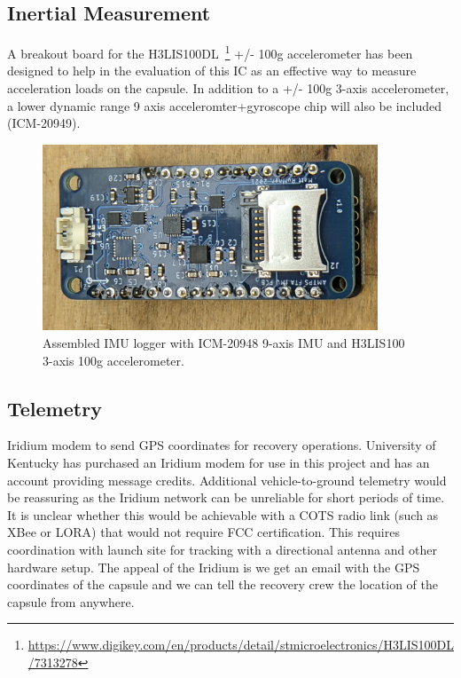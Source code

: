 \documentclass{article}
\begin{document}
\subsection{Inertial Measurement}
A breakout board for the H3LIS100DL~\footnote{\url{https://www.digikey.com/en/products/detail/stmicroelectronics/H3LIS100DL/7313278}} +/- 100g accelerometer has been designed to help in the evaluation of this IC as an effective way to measure acceleration loads on the capsule. In addition to a +/- 100g 3-axis accelerometer, a lower dynamic range 9 axis acceleromter+gyroscope chip will also be included (ICM-20949).

\begin{figure}[H]
	\centering
	\includegraphics[width=10cm]{images/imu-breakout}
	\caption{Assembled IMU logger with ICM-20948 9-axis IMU and H3LIS100 3-axis 100g accelerometer.}
	\label{fig:imu-breakout}
\end{figure}

\subsection{Telemetry}

Iridium modem to send GPS coordinates for recovery operations. University of Kentucky has purchased an Iridium modem for use in this project and has an account providing message credits. Additional vehicle-to-ground telemetry would be reassuring as the Iridium network can be unreliable for short periods of time. It is unclear whether this would be achievable with a COTS radio link (such as XBee or LORA) that would not require FCC certification. This requires coordination with launch site for tracking with a directional antenna and other hardware setup. The appeal of the Iridium is we get an email with the GPS coordinates of the capsule and we can tell the recovery crew the location of the capsule from anywhere. 
\end{document}
